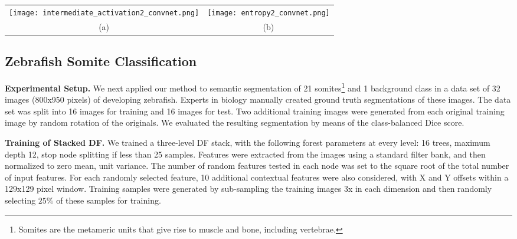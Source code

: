 \documentclass[twocolumn]{svjour3}
\begin{document}
\begin{figure*}[htp!]
\begin{center}
\begin{tabular}{cc}
\centering
   \texttt{[image: intermediate\_activation2\_convnet.png]} &
   \texttt{[image: entropy2\_convnet.png]} \\
	(a) & (b)
\end{tabular}
\end{center}
   \caption{\textbf{Visualization of internal activation layers.} We visualize the probability maps output by the intermediate output layers of the DF stack (\emph{e.g.,} Level 1,2 Output), and the activation maps from the corresponding hidden layers of the ConvNet (\emph{e.g.,} $H_3$, $H_6$) for (a) Kinect body parts, and (b) zebrafish somites. Notice that the activation from the ConvNet appears smoothed along the direction of the foreground classes compared to the noisier output of the stacked DF. Best viewed in colour}
\label{fig:activationLayers}
\end{figure*}


\subsection{Zebrafish Somite Classification}
\textbf{Experimental Setup. }
We next applied our method to semantic segmentation of 21 somites\footnote{Somites are the metameric units that give rise to muscle and bone, including vertebrae.} and 1 background class in a data set of 32 images (800x950 pixels) of developing zebrafish.
Experts in biology manually created ground truth segmentations of these images.
The data set was split into 16 images for training and 16 images for test.
Two additional training images were generated from each original training image by random rotation of the originals.
We evaluated the resulting segmentation by means of the class-balanced Dice score.

\textbf{Training of Stacked DF. }
We trained a three-level DF stack, with the following forest parameters at every level: 16 trees, maximum depth 12, stop node splitting if less than 25 samples. Features were extracted from the images using a standard filter bank, and then normalized to zero mean, unit variance. The number of random features tested in each node was set to the square root of the total number of input features. For each randomly selected feature, 10 additional contextual features were also considered, with X and Y offsets within a 129x129 pixel window. 
Training samples were generated by sub-sampling the training images 3x in each dimension and then randomly selecting $25\%$ of these samples for training.
\end{document}
